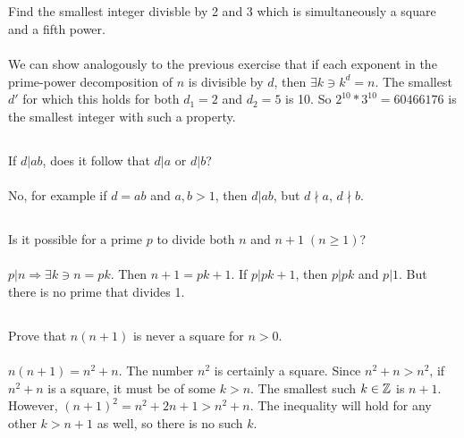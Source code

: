\documentclass{article}
\begin{document}
\subsection{}
Find the smallest integer divisble by 2 and 3 which is simultaneously a square
and a fifth power.\\~\\
We can show analogously to the previous exercise that if each exponent in the
prime-power decomposition of $n$ is divisible by $d$, then $\exists k \ni k^d = n$.
The smallest $d'$ for which this holds for both $d_1 = 2$ and $d_2 = 5$ is 10.
So $2^{10} * 3^{10} = 60466176$ is the smallest integer with such a property.

\subsection{}
If $d|ab$, does it follow that $d|a$ or $d|b$?\\~\\
No, for example if $d = ab$ and $a, b > 1$, then $d|ab$, but $d \nmid a$, $d \nmid b$.

\subsection{}
Is it possible for a prime $p$ to divide both $n$ and $n + 1 \; (n \geq 1)$?\\~\\
$p|n \Rightarrow \exists k \ni n = pk$.
Then $n + 1 = pk + 1$.
If $p|pk + 1$, then $p|pk$ and $p|1$.
But there is no prime that divides 1.

\subsection{}
Prove that $n(n + 1)$ is never a square for $n > 0$.\\~\\
$n(n + 1) = n^2 + n$. The number $n^2$ is certainly a square.
Since $n^2 + n > n^2$, if $n^2 + n$ is a square, it must be of some $k > n$.
The smallest such $k \in \mathbb{Z}$ is $n + 1$.
However, $(n + 1)^2 = n^2 + 2n + 1 > n^2 + n$.
The inequality will hold for any other $k > n + 1$ as well, so there is no such $k$.

\end{document}
